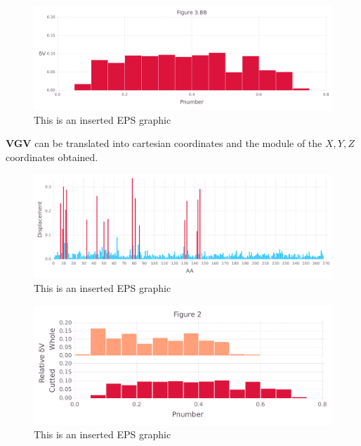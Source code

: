 \documentclass[10pt,letterpaper]{article}
\begin{document}
\begin{figure}[ht]
\begin{center}
\includegraphics[scale=0.5]{1m14/3bbfigure_hi-precision.pdf}
\caption{This is an inserted EPS graphic}
\label{fig11}
\end{center}
\end{figure}

\FloatBarrier


\textbf{VGV} can be translated into cartesian coordinates and the module of the \(X, Y, Z\) coordinates obtained.

\begin{figure}[ht]
\begin{center}
\includegraphics[scale=0.5]{1m14/5figure_hi-precision.pdf}
\caption{This is an inserted EPS graphic}
\label{fig13}
\end{center}
\end{figure}

\begin{figure}[ht]
\begin{center}
\includegraphics[scale=0.5]{1m14/3_both_hi-precision.pdf}
\caption{This is an inserted EPS graphic}
\label{fig13}
\end{center}
\end{figure}
\end{document}
